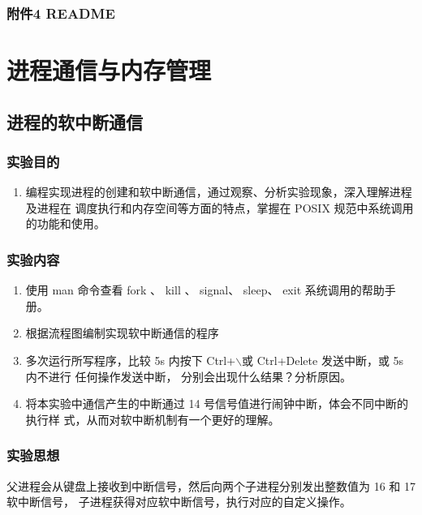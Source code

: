 \documentclass{article}
\begin{document}
    \subsubsection{附件4 README}
     

    \newpage
    \section{进程通信与内存管理}
    \subsection{进程的软中断通信}
    \subsubsection{实验目的}

    \begin{enumerate}
        \item 编程实现进程的创建和软中断通信，通过观察、分析实验现象，深入理解进程及进程在
        调度执行和内存空间等方面的特点，掌握在 POSIX 规范中系统调用的功能和使用。
    \end{enumerate}


    \subsubsection{实验内容}


    \begin{enumerate}
        \item 使用 man 命令查看 fork 、 kill 、 signal、 sleep、 exit 系统调用的帮助手册。
        \item 根据流程图编制实现软中断通信的程序
        \item 多次运行所写程序，比较 5s 内按下 Ctrl+$\backslash$或 Ctrl+Delete 发送中断，或 5s 内不进行
        任何操作发送中断， 分别会出现什么结果？分析原因。
        \item 将本实验中通信产生的中断通过 14 号信号值进行闹钟中断，体会不同中断的执行样
        式，从而对软中断机制有一个更好的理解。
    \end{enumerate}

    \subsubsection{实验思想}

    父进程会从键盘上接收到中断信号，然后向两个子进程分别发出整数值为 16 和 17 软中断信号，
    子进程获得对应软中断信号，执行对应的自定义操作。
\end{document}
